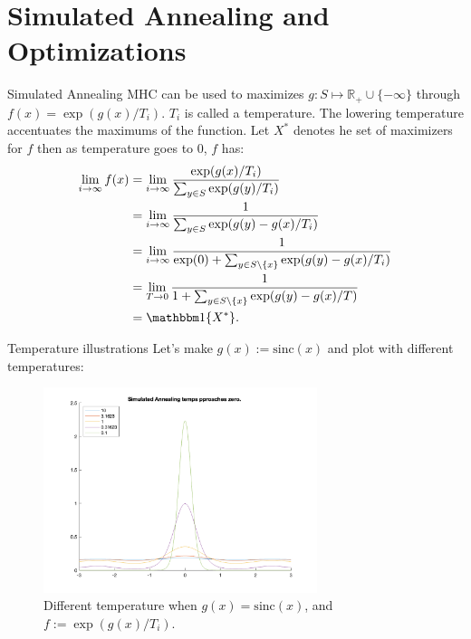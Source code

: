 \documentclass[11pt]{beamer}
\begin{document}
\section{Simulated Annealing and Optimizations}
    \begin{frame}{Simulated Annealing}
        MHC can be used to maximizes $g: S\mapsto \mathbb R_+\cup \{-\infty\}$ through $f(x) = \exp(g(x)/T_i)$. $T_i$ is called a temperature. The lowering temperature accentuates the maximums of the function. Let $X^{*}$ denotes he set of maximizers for $f$ then as temperature goes to $0$, $f$ has: 
        \begin{align*}
            \lim_{i\rightarrow \infty}f(x) 
            &= 
            \lim_{i\rightarrow \infty} \frac{\exp(g(x)/T_i)}
            {
                \sum_{y\in S}^{}
                \exp(g(y)/T_i)
            }
            \\
            &= 
            \lim_{i\rightarrow \infty}
            \frac{1}{\sum_{y\in S}^{}\exp(g(y) - g(x)/T_i)}
            \\
            &= 
            \lim_{i\rightarrow \infty}
            \frac{1}{\exp(0) + \sum_{y\in S\setminus\{x\}}^{}\exp(g(y) - g(x)/T_i)}
            \\
            &= 
            \lim_{T\rightarrow 0}
            \frac{1}{1 + \sum_{y\in S\setminus\{x\}}^{}\exp(g(y) - g(x)/T)}
            \\
            &= \mathbbm 1\{X^*\}. 
        \end{align*}
    \end{frame}    
    \begin{frame}{Temperature illustrations}
        Let's make $g(x):= \text{sinc}(x)$ and plot with different temperatures: 
        \begin{figure}[h]
            \centering
            \includegraphics[width=8cm]{sa_temp.png}
            \caption{Different temperature when $g(x) = \text{sinc}(x)$, and $f := \exp(g(x)/T_i)$. }
        \end{figure}
    \end{frame}
\end{document}
